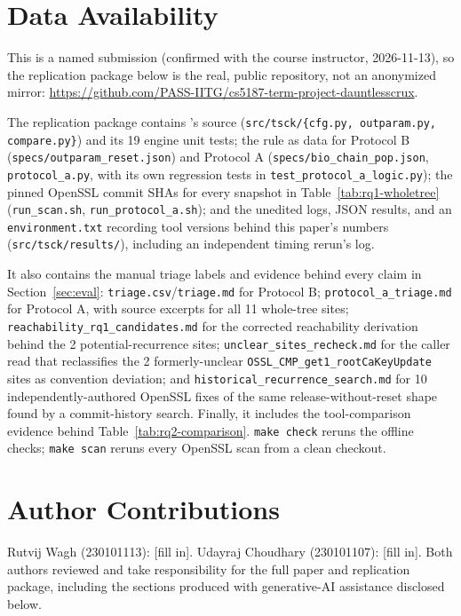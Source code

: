 \section*{Data Availability}
\label{sec:data}
This is a named submission (confirmed with the course instructor,
2026-11-13), so the replication package below is the real, public
repository, not an anonymized mirror:
\url{https://github.com/PASS-IITG/cs5187-term-project-dauntlesscrux}.

The replication package contains \tool's source
(\texttt{src/tsck/\allowbreak\{cfg.py, outparam.py, compare.py\}}) and its 19
engine unit tests; the rule as data for Protocol B
(\texttt{specs/outparam\_reset.json}) and Protocol A
(\texttt{specs/bio\_chain\_pop.json}, \texttt{protocol\_a.py}, with its
own regression tests in \texttt{test\_protocol\_a\_logic.py}); the
pinned OpenSSL commit SHAs for every snapshot in
Table~\ref{tab:rq1-wholetree} (\texttt{run\_scan.sh},
\texttt{run\_protocol\_a.sh}); and the unedited logs, JSON results, and an
\texttt{environment.txt} recording tool versions behind this paper's
numbers (\texttt{src/tsck/results/}), including an independent timing
rerun's log.

It also contains the manual triage labels and evidence behind every claim
in Section~\ref{sec:eval}: \texttt{triage.csv}/\texttt{triage.md} for
Protocol B; \texttt{protocol\_a\_triage.md} for Protocol A, with source
excerpts for all 11 whole-tree sites;
\texttt{reachability\_rq1\_candidates.md} for the corrected reachability
derivation behind the 2 potential-recurrence sites;
\texttt{unclear\_sites\_recheck.md} for the caller read that reclassifies
the 2 formerly-unclear \texttt{OSSL\_CMP\_get1\_rootCaKeyUpdate} sites as
convention deviation; and
\texttt{historical\_recurrence\_search.md} for 10 independently-authored
OpenSSL fixes of the same release-without-reset shape found by a
commit-history search. Finally, it includes the tool-comparison evidence
behind Table~\ref{tab:rq2-comparison}. \texttt{make check} reruns the
offline checks; \texttt{make scan} reruns every OpenSSL scan from a
clean checkout.

\section*{Author Contributions}
Rutvij Wagh (230101113): [fill in]. Udayraj Choudhary (230101107):
[fill in]. Both authors reviewed and take responsibility for the full
paper and replication package, including the sections produced with
generative-AI assistance disclosed below.

